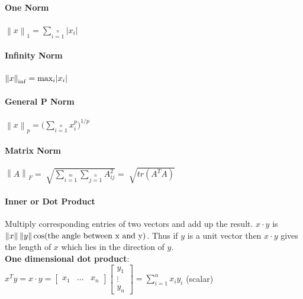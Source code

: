 \documentclass{article}
\newcommand{\norm}[1]{\left\lVert #1 \right\rVert} %
\begin{document}
\paragraph{One Norm} $\norm{x}_{1} = \sum\limits_{i=1}\limits^{n}{\lvert x_{i}\rvert}$
\paragraph{Infinity Norm} $\norm{x}_{\inf} = \textnormal{max}_{i} \lvert x_{i}\rvert$
\paragraph{General P Norm} $\norm{x}_{p} = \bigg(\sum\limits_{i=1}\limits^{n}{x_{i}^{p}}\bigg)^{1/p}$
\paragraph{Matrix Norm} $\norm{A}_{F} = \sqrt[]{\sum\limits_{i=1}\limits^{m}\sum\limits_{j=1}\limits^{n}{A_{ij}^2}} = \sqrt[]{tr(A^TA)}$

\paragraph{Inner or Dot Product} Multiply corresponding entries of two vectors and add up the result. $x\cdot y$ is $\norm{x}\norm{y}\cos(\textnormal{the angle between x and y})$. Thus if $y$ is a unit vector then $x \cdot y$ gives the length of $x$ which lies in the direction of $y$.\\
\textbf{One dimensional dot product}:
$x^Ty = x\cdot y = \begin{bmatrix} x_{1} & \dots & x_{n} \end{bmatrix} \begin{bmatrix} y_{1} \\ \vdots \\ y_{n} \end{bmatrix} = \sum_{i=1}^{n}x_{i}y_{i}$ (scalar)
\end{document}
